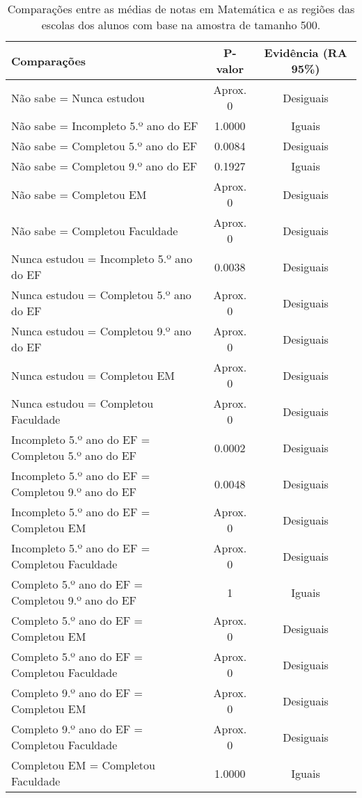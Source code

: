\begin{table}[htb]
    \centering
\caption{\label{comp_MT}Comparações entre as médias de notas em Matemática e as regiões das escolas dos alunos com base na amostra de tamanho 500.}
    \begin{tabular}{lcc}
    \toprule
    Comparações & P-valor & Evidência (RA 95\%)\\
    \midrule \midrule
    Não sabe = Nunca estudou & Aprox. 0 & Desiguais\\
    Não sabe = Incompleto 5.º ano do EF  & 1.0000 & Iguais\\
    Não sabe = Completou 5.º ano do EF  & 0.0084 & Desiguais\\
    Não sabe = Completou 9.º ano do EF  & 0.1927 & Iguais\\
    Não sabe = Completou EM & Aprox. 0 & Desiguais\\
    Não sabe = Completou Faculdade & Aprox. 0 & Desiguais\\
    Nunca estudou = Incompleto 5.º ano do EF  & 0.0038 & Desiguais\\
    Nunca estudou = Completou 5.º ano do EF  & Aprox. 0 & Desiguais\\
    Nunca estudou = Completou 9.º ano do EF  & Aprox. 0 & Desiguais\\
    Nunca estudou = Completou EM & Aprox. 0 & Desiguais\\
    Nunca estudou = Completou Faculdade & Aprox. 0 & Desiguais\\
    Incompleto 5.º ano do EF = Completou 5.º ano do EF  & 0.0002 & Desiguais\\
    Incompleto 5.º ano do EF = Completou 9.º ano do EF  & 0.0048 & Desiguais\\
    Incompleto 5.º ano do EF = Completou EM & Aprox. 0 & Desiguais\\
    Incompleto 5.º ano do EF = Completou Faculdade & Aprox. 0 & Desiguais\\
    Completo 5.º ano do EF = Completou 9.º ano do EF  & 1 & Iguais\\
    Completo 5.º ano do EF = Completou EM & Aprox. 0 & Desiguais\\
    Completo 5.º ano do EF = Completou Faculdade & Aprox. 0 & Desiguais\\
    Completo 9.º ano do EF = Completou EM & Aprox. 0 & Desiguais\\
    Completo 9.º ano do EF = Completou Faculdade & Aprox. 0 & Desiguais\\
    Completou EM = Completou Faculdade & 1.0000 & Iguais\\
    \bottomrule
    \end{tabular}
    \centering
    
\end{table}



